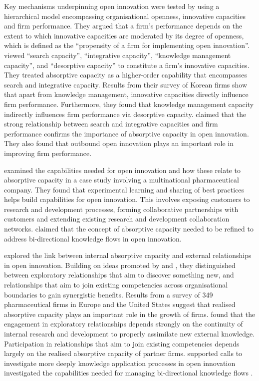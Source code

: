 Key mechanisms underpinning open innovation were tested by \citet{ahn2016beyond} using a hierarchical model encompassing organisational openness, innovative capacities and firm performance. They argued that a firm's performance depends on the extent to which innovative capacities are moderated by its degree of openness, which is defined as the \enquote{propensity of a firm for implementing open innovation}. \citet{ahn2016beyond} viewed \enquote{search capacity}, \enquote{integrative capacity}, \enquote{knowledge management capacity}, and \enquote{desorptive capacity} to constitute a firm's innovative capacities. They treated absorptive capacity as a higher-order capability that encompasses search and integrative capacity. Results from their survey of Korean firms show that apart from knowledge management, innovative capacities directly influence firm performance. Furthermore, they found that knowledge management capacity indirectly influences firm performance via desorptive capacity. \citet{ahn2016beyond} claimed that the strong relationship between search and integrative capacities and firm performance confirms the importance of absorptive capacity in open innovation. They also found that outbound open innovation plays an important role in improving firm performance. \medskip

\citet{hughes2010knowledge} examined the capabilities needed for open innovation and how these relate to absorptive capacity in a case study involving a multinational pharmaceutical company. They found that experimental learning and sharing of best practices helps build capabilities for open innovation. This involves exposing customers to research and development processes, forming collaborative partnerships with customers and extending existing research and development collaboration networks. \citet{hughes2010knowledge} claimed that the concept of absorptive capacity needed to be refined to address bi-directional knowledge flows in open innovation. \medskip

\citet{xia2016unpacking} explored the link between internal absorptive capacity and external relationships in open innovation. Building on ideas promoted by \citet{march1991exploration} and \cite{rothaermel2004exploration}, they distinguished between exploratory relationships that aim to discover something new, and relationships that aim to join existing competencies across organisational boundaries to gain synergistic benefits. Results from a survey of 349 pharmaceutical firms in Europe and the United States suggest that realised absorptive capacity plays an important role in the growth of firms. \cite{xia2016unpacking} found that the engagement in exploratory relationships depends strongly on the continuity of internal research and development to properly assimilate new external knowledge. Participation in relationships that aim to join existing competencies depends largely on the realised absorptive capacity of partner firms. \citet{xia2016unpacking} supported calls to investigate more deeply knowledge application processes in open innovation \citep[e.g.][]{lichtenthaler2009absorptive,lichtenthaler2010technology,robertson2012managing} investigated the capabilities needed for managing bi-directional knowledge flows \citep[e.g.][]{gassmann2010future,hughes2010knowledge}. \medskip


